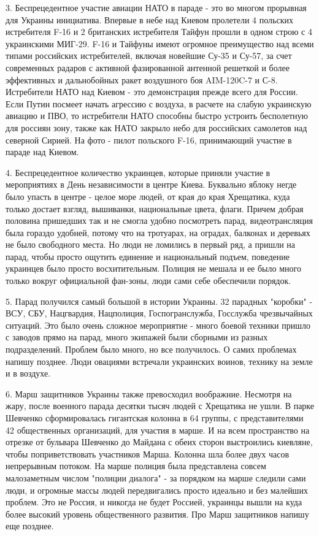 3. Беспрецедентное участие авиации НАТО в параде - это во многом прорывная для
Украины инициатива. Впервые в небе над Киевом пролетели 4 польских истребителя
F-16 и 2 британских истребителя Тайфун прошли в одном строю с 4 украинскими
МИГ-29. F-16 и Тайфуны имеют огромное преимущество над всеми типами российских
истребителей, включая новейшие Су-35 и Су-57, за счет  современных радаров с
активной фазированной антенной решеткой и более эффективных и дальнобойных
ракет воздушного боя AIM-120C-7 и С-8. Истребители НАТО над Киевом - это
демонстрация прежде всего для России. Если Путин посмеет начать агрессию с
воздуха, в расчете на  слабую украинскую авиацию и ПВО, то истребители НАТО
способны быстро устроить бесполетную для россиян зону, также как НАТО закрыло
небо для российских самолетов над северной Сирией. На  фото - пилот польского
F-16, принимающий участие в параде над Киевом. 

4. Беспрецедентное количество украинцев, которые приняли участие в мероприятиях
в День независимости в центре Киева. Буквально яблоку негде было упасть в
центре - целое море людей, от края до края Хрещатика, куда только достает
взгляд, вышиванки, национальные цвета, флаги. Причем добрая половина пришедших
так и не смогла удобно посмотреть парад, видеотрансляция была гораздо удобней,
потому что на тротуарах, на оградах, балконах и деревьях не было свободного
места.   Но люди не ломились в первый ряд, а пришли на парад, чтобы просто
ощутить единение и национальный подъем, поведение украинцев было просто
восхитительным. Полиция не мешала и ее было много только вокруг официальной
фан-зоны, люди сами себе обеспечили порядок. 

5. Парад получился самый большой в истории Украины. 32 парадных "коробки" -
ВСУ, СБУ, Нацгвардия, Нацполиция, Госпогранслужба, Госслужба чрезвычайных
ситуаций. Это было очень сложное мероприятие - много боевой техники пришло с
заводов прямо на парад, много экипажей были сборными из разных подразделений.
Проблем было много, но все получилось. О самих проблемах напишу позднее. Люди
овациями встречали украинских воинов, технику на земле и в воздухе.

6. Марш защитников Украины также превосходил воображние. Несмотря на жару,
после военного парада десятки тысяч людей с Хрещатика не ушли. В парке Шевченко
сформировалась гигантская колонна в 64 группы, с представителями 42
общественных организаций, для участия в марше. И на всем пространство на
отрезке от бульвара Шевченко до Майдана с обеих сторон выстроились киевляне,
чтобы поприветствовать участников Марша. Колонна шла более двух часов
непрерывным потоком. На марше полиция была представлена совсем малозаметным
числом "полиции диалога" - за порядком на марше следили сами люди, и огромные
массы людей передвигались просто идеально и без малейших проблем. Это не
Россия, и никогда не будет Россией, украинцы вышли на куда более высокий
уровень общественного развития. Про Марш защитников напишу еще позднее.

